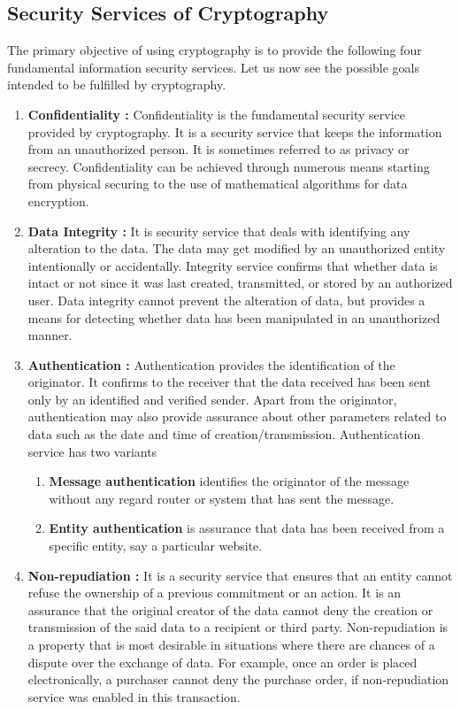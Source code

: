\documentclass[british]{report}
\begin{document}
\medskip{}


\subsection{Security Services of Cryptography}

The primary objective of using cryptography is to provide the following
four fundamental information security services. Let us now see the
possible goals intended to be fulfilled by cryptography.
\begin{enumerate}
	\item \textbf{Confidentiality : }Confidentiality is the fundamental security
	      service provided by cryptography. It is a security service that keeps
	      the information from an unauthorized person. It is sometimes referred
	      to as privacy or secrecy. Confidentiality can be achieved through
	      numerous means starting from physical securing to the use of mathematical
	      algorithms for data encryption.
	\item \textbf{Data Integrity :} It is security service that deals with identifying
	      any alteration to the data. The data may get modified by an unauthorized
	      entity intentionally or accidentally. Integrity service confirms that
	      whether data is intact or not since it was last created, transmitted,
	      or stored by an authorized user. Data integrity cannot prevent the
	      alteration of data, but provides a means for detecting whether data
	      has been manipulated in an unauthorized manner.
	\item \textbf{Authentication : }Authentication provides the identification
	      of the originator. It confirms to the receiver that the data received
	      has been sent only by an identified and verified sender. Apart from
	      the originator, authentication may also provide assurance about other
	      parameters related to data such as the date and time of creation/transmission.
	      Authentication service has two variants \textminus{}
	      \begin{enumerate}
		      \item \textbf{Message authentication} identifies the originator of the message
		            without any regard router or system that has sent the message.
		      \item \textbf{Entity authentication} is assurance that data has been received
		            from a specific entity, say a particular website.
	      \end{enumerate}
	\item \textbf{Non-repudiation : }It is a security service that ensures that
	      an entity cannot refuse the ownership of a previous commitment or
	      an action. It is an assurance that the original creator of the data
	      cannot deny the creation or transmission of the said data to a recipient
	      or third party. Non-repudiation is a property that is most desirable
	      in situations where there are chances of a dispute over the exchange
	      of data. For example, once an order is placed electronically, a purchaser
	      cannot deny the purchase order, if non-repudiation service was enabled
	      in this transaction.
\end{enumerate}
\end{document}

